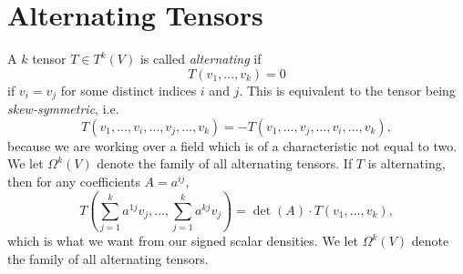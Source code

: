 \begin{comment}

To begin with, we would like a formula which gives the area of a $k$ dimensional parallelogram spanned by $k$ vectors $v_1, \dots, v_k$ in $\RR^n$. This quantity is
%
\[ \det \left( v_i \cdot v_j \right)^{1/2} \]
%
To see why, we note that this quantity is clearly invariant under rotation, and since we would imagine rotations to preserve rotation, we may assume $v_1, \dots, v_k$ lie in the $k$ dimensional plane in $\RR^n$ spanned by $e_1, \dots, e_k$. If $v_i = w_i \times \{ 0 \}$ for $w_i \in \RR^k$, then
%
\[ \det \left( v_i \cdot v_j \right)^{1/2} = \det \left( w_i \cdot w_j \right)^{1/2} \]
%
That this right hand side is equal to what we would expect the usual volume to be, i.e. $\det(w_1, \dots, w_k)$, is obtained by noting that if $A$ is a $k \times k$ matrix whose $i$'th column is $w_i$, then $(A^T A)_{ij} = w_j \cdot w_i$, and so
%
\begin{align*}
    \det( w_i \cdot w_j) = \det( A^T A ) = \det(A)^2 = \det(w_1, \dots, w_k)^2.
\end{align*}
%
We will refer to the matrix $( v_i \cdot v_j )$ of $k$ vectors as the Grammian, denoted $G(v_1, \dots, v_k)$. Thus the area of the parallelogram spanned by these vectors is equal to $\det(G(v_1, \dots, v_k))^{1/2}$. We note that if $A$ is the matrix with columns $v_1, \dots, v_k$, then $(A^T A)_{ij} = v_i \cdot v_j$, so $G(v_1, \dots, v_k) = A^T A$. 

If $B$ is a $k \times k$ matrix, then $AB$ is a matrix whose $i$'th column is  are now a linear combination of the vectors $v_1, \dots, v_k$. We calculate that
%
\[ G(\sum v_1, \dots, Bv_k) = (BA)^T BA = A^T B^TB A, \]
%
and so $\det(G(Bv_1,\dots,Bv_k))^{1/2} = \det(A^T B^T B A)$.

\end{comment}

\section{Alternating Tensors}

A $k$ tensor $T \in T^k(V)$ is called \emph{alternating} if
%
\[ T(v_1, \dots, v_k) = 0 \]
%
if $v_i = v_j$ for some distinct indices $i$ and $j$. This is equivalent to the tensor being \emph{skew-symmetric}, i.e.
%
\[ T(v_1, \dots, v_i, \dots, v_j, \dots, v_k) = - T(v_1, \dots, v_j, \dots, v_i, \dots, v_k), \]
%
because we are working over a field which is of a characteristic not equal to two. We let $\Omega^k(V)$ denote the family of all alternating tensors. If $T$ is alternating, then for any coefficients $A = a^{ij}$,
%
\[ T \left(\sum_{j = 1}^k a^{1j} v_j, \dots, \sum_{j = 1}^k a^{kj} v_j \right) = \det(A) \cdot T(v_1, \dots, v_k), \]
%
which is what we want from our signed scalar densities. We let $\Omega^k(V)$ denote the family of all alternating tensors.

